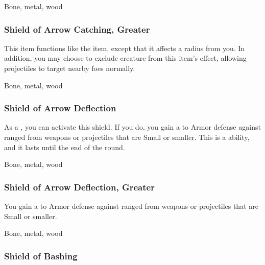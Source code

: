  Bone, metal, wood


\lowercase{\hypertarget{item:Shield of Arrow Catching, Greater}{}}\label{item:Shield of Arrow Catching, Greater}
\hypertarget{item:Shield of Arrow Catching, Greater}{\subsubsection{Shield of Arrow Catching, Greater\hfill{}}}

This item functions like the  item, except that it affects a \arealarge radius from you.
In addition, you may choose to exclude creature from this item's effect, allowing projectiles to target nearby foes normally.



 Bone, metal, wood


\lowercase{\hypertarget{item:Shield of Arrow Deflection}{}}\label{item:Shield of Arrow Deflection}
\hypertarget{item:Shield of Arrow Deflection}{\subsubsection{Shield of Arrow Deflection\hfill{}}}

As a , you can activate this shield.
If you do, you gain a   to Armor defense against ranged  from weapons or projectiles that are Small or smaller.
This is a  ability, and it lasts until the end of the round.



 Bone, metal, wood


\lowercase{\hypertarget{item:Shield of Arrow Deflection, Greater}{}}\label{item:Shield of Arrow Deflection, Greater}
\hypertarget{item:Shield of Arrow Deflection, Greater}{\subsubsection{Shield of Arrow Deflection, Greater\hfill{}}}

You gain a   to Armor defense against ranged  from weapons or projectiles that are Small or smaller.



 Bone, metal, wood


\lowercase{\hypertarget{item:Shield of Bashing}{}}\label{item:Shield of Bashing}
\hypertarget{item:Shield of Bashing}{\subsubsection{Shield of Bashing\hfill{}}}

